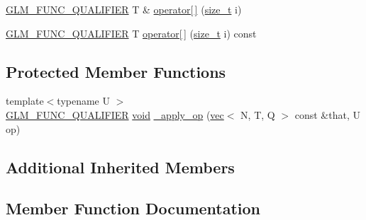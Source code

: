\begin{DoxyCompactItemize}
\item 
\hyperlink{setup_8hpp_a33fdea6f91c5f834105f7415e2a64407}{G\+L\+M\+\_\+\+F\+U\+N\+C\+\_\+\+Q\+U\+A\+L\+I\+F\+I\+ER} T \& \hyperlink{structglm_1_1detail_1_1__swizzle__base2_a9a31c29fd5419a40ef6ae9dbbbb3887e}{operator\mbox{[}$\,$\mbox{]}} (\hyperlink{_s_d_l__config__winrt_8h_a7c94ea6f8948649f8d181ae55911eeaf}{size\+\_\+t} i)
\item 
\hyperlink{setup_8hpp_a33fdea6f91c5f834105f7415e2a64407}{G\+L\+M\+\_\+\+F\+U\+N\+C\+\_\+\+Q\+U\+A\+L\+I\+F\+I\+ER} T \hyperlink{structglm_1_1detail_1_1__swizzle__base2_a0e341ddb30329eabeac3361833e45cd0}{operator\mbox{[}$\,$\mbox{]}} (\hyperlink{_s_d_l__config__winrt_8h_a7c94ea6f8948649f8d181ae55911eeaf}{size\+\_\+t} i) const
\end{DoxyCompactItemize}
\subsection*{Protected Member Functions}
\begin{DoxyCompactItemize}
\item 
{\footnotesize template$<$typename U $>$ }\\\hyperlink{setup_8hpp_a33fdea6f91c5f834105f7415e2a64407}{G\+L\+M\+\_\+\+F\+U\+N\+C\+\_\+\+Q\+U\+A\+L\+I\+F\+I\+ER} \hyperlink{_s_d_l__opengles2__gl2ext_8h_ae5d8fa23ad07c48bb609509eae494c95}{void} \hyperlink{structglm_1_1detail_1_1__swizzle__base2_a1b95928a524631e5bc6976ee1c7a6dd9}{\+\_\+apply\+\_\+op} (\hyperlink{structglm_1_1vec}{vec}$<$ N, T, Q $>$ const \&that, U op)
\end{DoxyCompactItemize}
\subsection*{Additional Inherited Members}


\subsection{Member Function Documentation}
\mbox{\label{structglm_1_1detail_1_1__swizzle__base2_a1b95928a524631e5bc6976ee1c7a6dd9}} 
